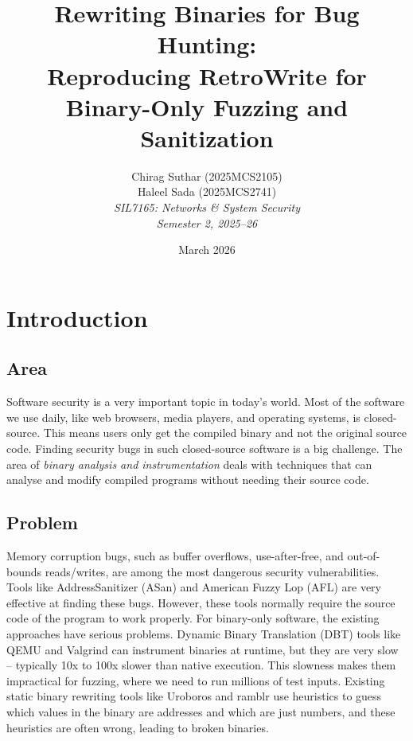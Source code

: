 \documentclass[10pt,a4paper]{article}
\title{\textbf{Rewriting Binaries for Bug Hunting: \\ Reproducing RetroWrite for Binary-Only Fuzzing and Sanitization}}
\author{
    Chirag Suthar (2025MCS2105) \\
    Haleel Sada (2025MCS2741) \\[10pt]
    \textit{SIL7165: Networks \& System Security} \\
    \textit{Semester 2, 2025--26}
}
\date{March 2026}
\begin{document}
\maketitle
\newpage


\section{Introduction}

\subsection{Area}
Software security is a very important topic in today's world. Most of the software we use daily, like web browsers, media players, and operating systems, is closed-source. This means users only get the compiled binary and not the original source code. Finding security bugs in such closed-source software is a big challenge. The area of \textit{binary analysis and instrumentation} deals with techniques that can analyse and modify compiled programs without needing their source code.

\subsection{Problem}
Memory corruption bugs, such as buffer overflows, use-after-free, and out-of-bounds reads/writes, are among the most dangerous security vulnerabilities. Tools like AddressSanitizer (ASan) \cite{asan} and American Fuzzy Lop (AFL) \cite{afl} are very effective at finding these bugs. However, these tools normally require the source code of the program to work properly. For binary-only software, the existing approaches have serious problems. Dynamic Binary Translation (DBT) tools like QEMU \cite{qemu} and Valgrind \cite{valgrind} can instrument binaries at runtime, but they are very slow -- typically 10x to 100x slower than native execution. This slowness makes them impractical for fuzzing, where we need to run millions of test inputs. Existing static binary rewriting tools like Uroboros \cite{uroboros} and ramblr \cite{ramblr} use heuristics to guess which values in the binary are addresses and which are just numbers, and these heuristics are often wrong, leading to broken binaries.
\end{document}
